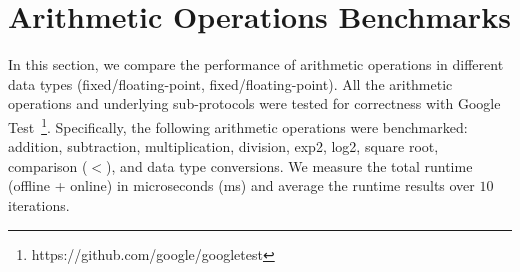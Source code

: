 \section{Arithmetic Operations Benchmarks}
\label{sec:ArithmeticOperationsPerformanceEvaluation}
In this section, we compare the performance of arithmetic operations in different data types (\booleanGMW fixed/floating-point, \arithmeticGMW fixed/floating-point).
All the arithmetic operations and underlying sub-protocols were tested for correctness with Google Test~\footnote{https://github.com/google/googletest}.
Specifically, the following arithmetic operations were benchmarked: addition, subtraction, multiplication, division, exp2, log2, square root, comparison ($<$), and data type conversions.
We measure the total runtime (offline + online) in microseconds (ms) and average the runtime results over $10$ iterations.

